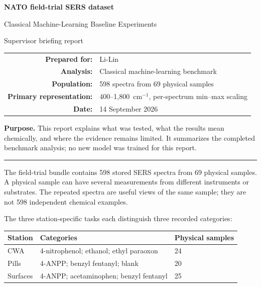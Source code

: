\documentclass[10pt]{article}
\newcommand{\sectiontitle}[1]{\vspace{2pt}{\large\bfseries #1}\par\vspace{1pt}\hrule\vspace{3pt}}
\begin{document}
\color{black}

\begin{titlepage}
\thispagestyle{empty}
\vspace*{2.3cm}
\begin{center}
{\fontsize{25}{30}\selectfont\bfseries NATO field-trial SERS dataset\par}
\vspace{0.55cm}
{\fontsize{18}{23}\selectfont Classical Machine-Learning Baseline Experiments\par}
\vspace{1.2cm}
{\large Supervisor briefing report\par}
\vfill
\begin{tabular}{rl}
\textbf{Prepared for:} & Li-Lin\\
\textbf{Analysis:} & Classical machine-learning benchmark\\
\textbf{Population:} & 598 spectra from 69 physical samples\\
\textbf{Primary representation:} & 400--1,800~cm$^{-1}$, per-spectrum min--max scaling\\
\textbf{Date:} & 14 September 2026
\end{tabular}
\vfill
\begin{minipage}{0.84\textwidth}
\small
\textbf{Purpose.} This report explains what was tested, what the results mean chemically, and where the evidence remains limited. It summarizes the completed benchmark analysis; no new model was trained for this report.
\end{minipage}
\vspace*{1.5cm}
\end{center}
\end{titlepage}

\sectiontitle{1. What was tested}
The field-trial bundle contains 598 stored SERS spectra from 69 physical samples. A physical sample can have several measurements from different instruments or substrates. The repeated spectra are useful views of the same sample; they are not 598 independent chemical examples.

The three station-specific tasks each distinguish three recorded categories:
\begin{center}
\begin{tabular}{lll}
\toprule
Station & Categories & Physical samples\\
\midrule
CWA & 4-nitrophenol; ethanol; ethyl paraoxon & 24\\
Pills & 4-ANPP; benzyl fentanyl; blank & 20\\
Surfaces & 4-ANPP; acetaminophen; benzyl fentanyl & 25\\
\bottomrule
\end{tabular}
\end{center}
\end{document}
